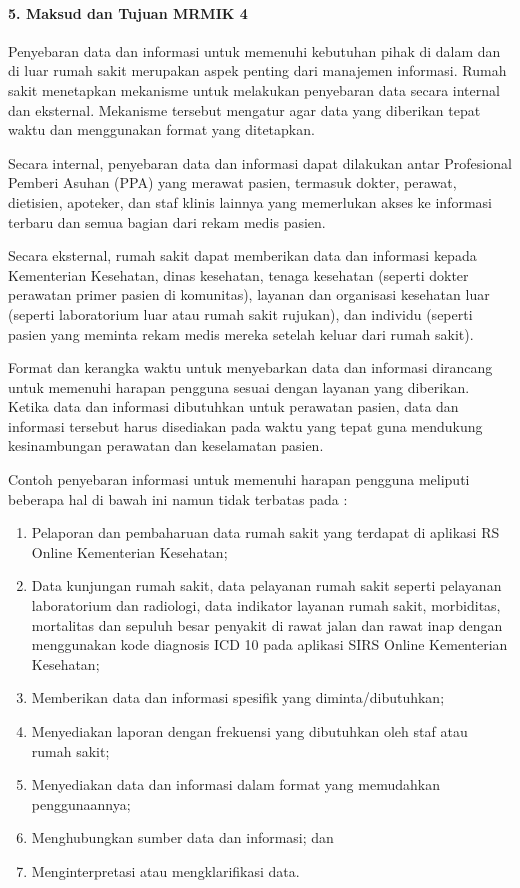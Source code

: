 \documentclass[
]{book}
\providecommand{\tightlist}{%
  \setlength{\itemsep}{0pt}\setlength{\parskip}{0pt}}
\begin{document}
\hypertarget{maksud-dan-tujuan-mrmik-4}{%
\paragraph*{5. Maksud dan Tujuan MRMIK 4}\label{maksud-dan-tujuan-mrmik-4}}

Penyebaran data dan informasi untuk memenuhi kebutuhan pihak di dalam dan di luar rumah sakit merupakan aspek penting dari manajemen informasi. Rumah sakit menetapkan mekanisme untuk melakukan penyebaran data secara internal dan eksternal. Mekanisme tersebut mengatur agar data yang diberikan tepat waktu dan menggunakan format yang ditetapkan.

Secara internal, penyebaran data dan informasi dapat dilakukan antar Profesional Pemberi Asuhan (PPA) yang merawat pasien, termasuk dokter, perawat, dietisien, apoteker, dan staf klinis lainnya yang memerlukan akses ke informasi terbaru dan semua bagian dari rekam medis pasien.

Secara eksternal, rumah sakit dapat memberikan data dan informasi kepada Kementerian Kesehatan, dinas kesehatan, tenaga kesehatan (seperti dokter perawatan primer pasien di komunitas), layanan dan organisasi kesehatan luar (seperti laboratorium luar atau rumah sakit rujukan), dan individu (seperti pasien yang meminta rekam medis mereka setelah keluar dari rumah sakit).

Format dan kerangka waktu untuk menyebarkan data dan informasi dirancang untuk memenuhi harapan pengguna sesuai dengan layanan yang diberikan. Ketika data dan informasi dibutuhkan untuk perawatan pasien, data dan informasi tersebut harus disediakan pada waktu yang tepat guna mendukung kesinambungan perawatan dan keselamatan pasien.

Contoh penyebaran informasi untuk memenuhi harapan pengguna meliputi beberapa hal di bawah ini namun tidak terbatas pada :

\begin{enumerate}
\def\labelenumi{\alph{enumi}.}
\tightlist
\item
  Pelaporan dan pembaharuan data rumah sakit yang terdapat di aplikasi RS Online Kementerian Kesehatan;
\item
  Data kunjungan rumah sakit, data pelayanan rumah sakit seperti pelayanan laboratorium dan radiologi, data indikator layanan rumah sakit, morbiditas, mortalitas dan sepuluh besar penyakit di rawat jalan dan rawat inap dengan menggunakan kode diagnosis ICD 10 pada aplikasi SIRS Online Kementerian Kesehatan;
\item
  Memberikan data dan informasi spesifik yang diminta/dibutuhkan;
\item
  Menyediakan laporan dengan frekuensi yang dibutuhkan oleh staf atau rumah sakit;
\item
  Menyediakan data dan informasi dalam format yang memudahkan penggunaannya;
\item
  Menghubungkan sumber data dan informasi; dan
\item
  Menginterpretasi atau mengklarifikasi data.
\end{enumerate}
\end{document}
